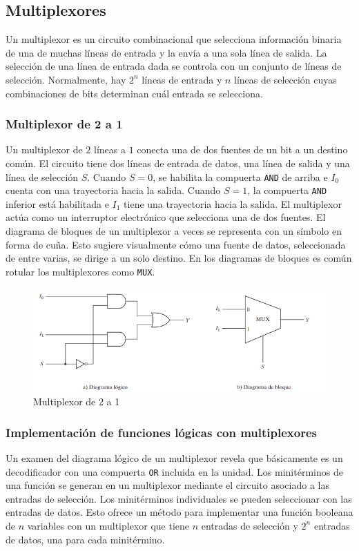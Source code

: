 \newpage
\subsection{Multiplexores}
Un multiplexor es un circuito combinacional que selecciona información binaria de una de muchas líneas de entrada y la envía a una sola línea de salida. La selección de una línea de entrada dada se controla con un conjunto de líneas de selección. Normalmente, hay $2^n$ líneas de entrada y $n$ líneas de selección cuyas combinaciones de bits determinan cuál entrada se selecciona.


\subsubsection{Multiplexor de 2 a 1}
Un multiplexor de $2$ líneas a $1$ conecta una de dos fuentes de un bit a un destino común. El circuito tiene dos líneas de entrada de datos, una línea de salida y una línea de selección $S$. Cuando $S=0$, se habilita la compuerta \texttt{AND} de arriba e $I_0$ cuenta con una trayectoria hacia la salida. Cuando $S=1$, la compuerta \texttt{AND} inferior está habilitada e $I_1$ tiene una trayectoria hacia la salida. El multiplexor actúa como un interruptor electrónico que selecciona una de dos fuentes. El diagrama de bloques de un multiplexor a veces se representa con un símbolo en forma de cuña. Esto sugiere visualmente cómo una fuente de datos, seleccionada de entre varias, se dirige a un solo destino. En los diagramas de bloques es común rotular los multiplexores como \texttt{MUX}.
\begin{figure}[h]
\centering
\includegraphics[scale=0.8]{img/mux2a1.png}
\caption{Multiplexor de 2 a 1}
\end{figure}

\subsubsection{Implementación de funciones lógicas con multiplexores}
Un examen del diagrama lógico de un multiplexor revela que básicamente es un decodificador con una compuerta \texttt{OR} incluida en la unidad. Los minitérminos de una función se generan en un multiplexor mediante el circuito asociado a las entradas de selección. Los minitérminos individuales se pueden seleccionar con las entradas de datos. Esto ofrece un método para implementar una función booleana de $n$ variables con un multiplexor que tiene $n$ entradas de selección y $2^n$ entradas de datos, una para cada minitérmino.

